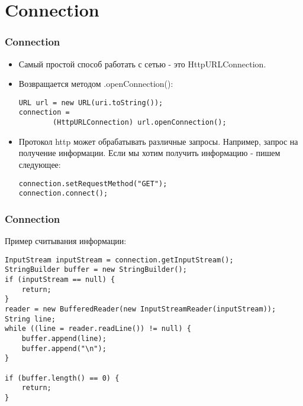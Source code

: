 \documentclass[utf8]{beamer}
\begin{document}
\section{Connection}
\begin{frame}[fragile]
    \frametitle{Connection}
    \begin{itemize}
        \item Самый простой способ работать с сетью - это HttpURLConnection.
        \item Возвращается методом .openConnection():
        \begin{lstlisting}
URL url = new URL(uri.toString());
connection = 
        (HttpURLConnection) url.openConnection();
        \end{lstlisting}
        \item Протокол http может обрабатывать различные запросы. Например, запрос на получение информации. Если мы хотим получить информацию - пишем следующее:
        \begin{lstlisting}
connection.setRequestMethod("GET");
connection.connect();
        \end{lstlisting}
    \end{itemize}
\end{frame}
\begin{frame}[fragile]
    \frametitle{Connection}
    Пример считывания информации:
    \begin{lstlisting}[basicstyle=\tiny]
InputStream inputStream = connection.getInputStream();
StringBuilder buffer = new StringBuilder();
if (inputStream == null) {
    return;
}
reader = new BufferedReader(new InputStreamReader(inputStream));
String line;
while ((line = reader.readLine()) != null) {
    buffer.append(line);
    buffer.append("\n");
}

if (buffer.length() == 0) {
    return;
}
    \end{lstlisting}
\end{frame}
\end{document}
